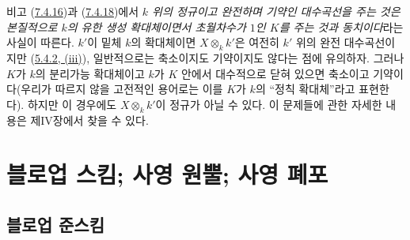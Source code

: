 \begin{namedtheorem}[7.4.19]{비고}
\label{II.7.4.19-ko}
(\hyperref[II.7.4.16-ko]{7.4.16})과
(\hyperref[II.7.4.18-ko]{7.4.18})에서 \emph{$k$ 위의 정규이고 완전하며
기약인 대수곡선을 주는 것은 본질적으로 $k$의 유한 생성 확대체이면서
초월차수가 $1$인 $K$를 주는 것과 동치이다}라는 사실이 따른다. $k'$이
밑체 $k$의 확대체이면 $X\otimes_k k'$은 여전히 $k'$ 위의 완전
대수곡선이지만 (\hyperref[II.5.4.2-ko]{5.4.2, (iii)}), 일반적으로는
축소이지도 기약이지도 않다는 점에 유의하자. 그러나 $K$가 $k$의
분리가능 확대체이고 $k$가 $K$ 안에서 대수적으로 닫혀 있으면 축소이고
기약이다(우리가 따르지 않을 고전적인 용어로는 이를 $K$가 $k$의
``정칙 확대체''라고 표현한다). 하지만 이 경우에도
$X\otimes_k k'$이 정규가 아닐 수 있다. 이 문제들에 관한 자세한 내용은
제IV장에서 찾을 수 있다.
\end{namedtheorem}

\section{블로업 스킴; 사영 원뿔; 사영 폐포}
\label{section:II.8-ko}

\subsection{블로업 준스킴}
\label{subsection:II.8.1-ko}

